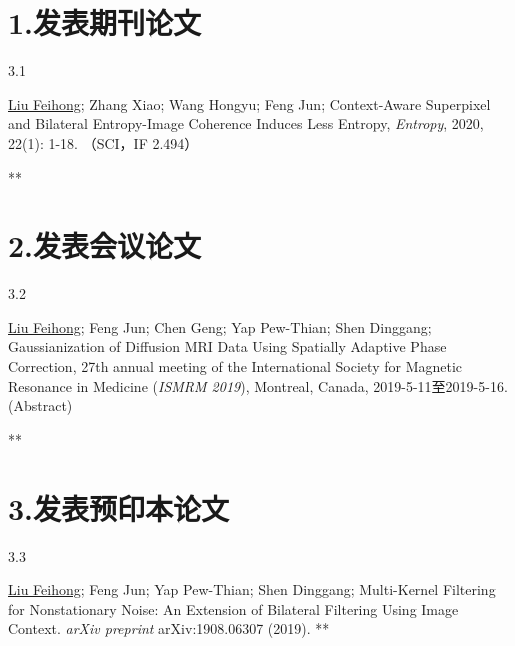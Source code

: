 
\begin{results}


\section*{1.\hspace{0.75em}发表期刊论文}

\begin{resultslist}{\hspace{-0.25em}3.1\hspace{0.5em}}
	
	
	\resultslistitem  \uline{Liu Feihong}; Zhang Xiao; Wang Hongyu; Feng Jun; Context-Aware Superpixel and Bilateral Entropy-Image Coherence Induces Less Entropy, \textit{Entropy}, 2020, 22(1): 1-18. （SCI，IF 2.494） %
	
	\resumelistitem ***
	
\end{resultslist}

\section*{2.\hspace{0.75em}发表会议论文}

\begin{resultslist}{\hspace{-0.25em}3.2\hspace{0.5em} }
	
	\resultslistitem \uline{Liu Feihong}; Feng Jun; Chen Geng; Yap Pew-Thian; Shen Dinggang; Gaussianization of Diffusion MRI Data Using Spatially Adaptive Phase Correction, 27th annual meeting of the International Society for Magnetic Resonance in Medicine (\textit{ISMRM 2019}), Montreal, Canada, 2019-5-11至2019-5-16. (Abstract) %
	
	\resumelistitem ***
		
	
\end{resultslist}

\section*{3.\hspace{0.75em}发表预印本论文}

\begin{resultslist}{\hspace{-0.25em}3.3\hspace{0.5em}}

\resultslistitem  
\uline{Liu Feihong}; Feng Jun; Yap Pew-Thian; Shen Dinggang; Multi-Kernel Filtering for Nonstationary Noise: An Extension of Bilateral Filtering Using Image Context. \textit{arXiv preprint} arXiv:1908.06307 (2019). 
\resumelistitem ***


\end{resultslist}
\end{results}
